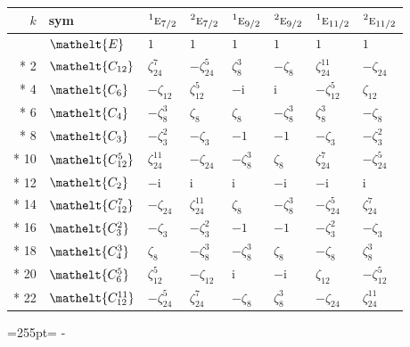\documentclass[10pt,a4paper]{article}
\newcommand{\needspace}[1]{\par\penalty-100\begingroup\dimen0=#1\relax\dimen2=\pagegoal
  \advance\dimen2-\pagetotal\ifdim\dimen0>\dimen2\relax\ifdim\dimen2>0pt\vfil\break\fi\fi
  \endgroup}
\numberwithin{equation}{section}
\newcommand{\eltfont}[1]{{\let\sigma\eltsigma\mathelt{#1}}}
\newcommand{\irr}[1]{\text{\normalfont\scshape #1}}
\newcommand{\conjpair}[1]{{}^{#1}}
\newcommand{\cls}[1]{\eltfont{#1}}
\newcommand{\iunit}{\mathrm{i}}
\newcommand{\rootunity}[1]{\zeta_{#1}}
\begin{document}
{\small\setlength{\tabcolsep}{4pt}
\begin{longtable}{@{}rlllllll@{}}\toprule
$k$ & sym & $\conjpair{1}\irr{e}_{7/2}$ & $\conjpair{2}\irr{e}_{7/2}$ & $\conjpair{1}\irr{e}_{9/2}$ & $\conjpair{2}\irr{e}_{9/2}$ & $\conjpair{1}\irr{e}_{11/2}$ & $\conjpair{2}\irr{e}_{11/2}$\\\midrule\endhead
\bottomrule\endfoot\endlastfoot
0 & $\cls{E}$ & $1$ & $1$ & $1$ & $1$ & $1$ & $1$\\*
2 & $\cls{C_{12}}$ & $\rootunity{24}^{7}$ & $-\rootunity{24}^{5}$ & $\rootunity{8}^{3}$ & $-\rootunity{8}$ & $\rootunity{24}^{11}$ & $-\rootunity{24}$\\*
4 & $\cls{C_{6}}$ & $-\rootunity{12}$ & $\rootunity{12}^{5}$ & $-\iunit{}$ & $\iunit{}$ & $-\rootunity{12}^{5}$ & $\rootunity{12}$\\*
6 & $\cls{C_{4}}$ & $-\rootunity{8}^{3}$ & $\rootunity{8}$ & $\rootunity{8}$ & $-\rootunity{8}^{3}$ & $\rootunity{8}^{3}$ & $-\rootunity{8}$\\*
8 & $\cls{C_{3}}$ & $-\rootunity{3}^{2}$ & $-\rootunity{3}$ & $-1$ & $-1$ & $-\rootunity{3}$ & $-\rootunity{3}^{2}$\\*
10 & $\cls{C_{12}^{5}}$ & $\rootunity{24}^{11}$ & $-\rootunity{24}$ & $-\rootunity{8}^{3}$ & $\rootunity{8}$ & $\rootunity{24}^{7}$ & $-\rootunity{24}^{5}$\\*
12 & $\cls{C_{2}}$ & $-\iunit{}$ & $\iunit{}$ & $\iunit{}$ & $-\iunit{}$ & $-\iunit{}$ & $\iunit{}$\\*
14 & $\cls{C_{12}^{7}}$ & $-\rootunity{24}$ & $\rootunity{24}^{11}$ & $\rootunity{8}$ & $-\rootunity{8}^{3}$ & $-\rootunity{24}^{5}$ & $\rootunity{24}^{7}$\\*
16 & $\cls{C_{3}^{2}}$ & $-\rootunity{3}$ & $-\rootunity{3}^{2}$ & $-1$ & $-1$ & $-\rootunity{3}^{2}$ & $-\rootunity{3}$\\*
18 & $\cls{C_{4}^{3}}$ & $\rootunity{8}$ & $-\rootunity{8}^{3}$ & $-\rootunity{8}^{3}$ & $\rootunity{8}$ & $-\rootunity{8}$ & $\rootunity{8}^{3}$\\*
20 & $\cls{C_{6}^{5}}$ & $\rootunity{12}^{5}$ & $-\rootunity{12}$ & $\iunit{}$ & $-\iunit{}$ & $\rootunity{12}$ & $-\rootunity{12}^{5}$\\*
22 & $\cls{C_{12}^{11}}$ & $-\rootunity{24}^{5}$ & $\rootunity{24}^{7}$ & $-\rootunity{8}$ & $\rootunity{8}^{3}$ & $-\rootunity{24}$ & $\rootunity{24}^{11}$\\
\bottomrule\end{longtable}}
\needspace{255pt}
\end{document}
